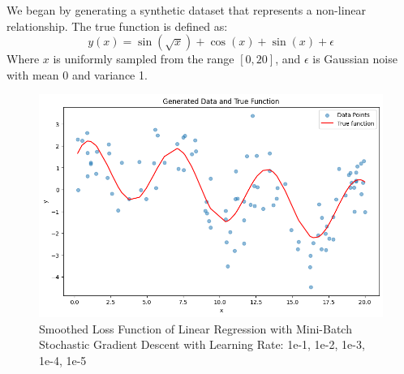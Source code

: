 \documentclass{article}
\begin{document}
We began by generating a synthetic dataset that represents a non-linear relationship. The true function is defined as:
\[
y(x) = \sin(\sqrt{x}) + \cos(x) + \sin(x) + \epsilon
\]
Where $x$ is uniformly sampled from the range $[0, 20]$, and $\epsilon$ is Gaussian noise with mean 0 and variance 1.
\begin{figure}[H]
    \centering
    \includegraphics[width=0.5\linewidth]{figures/data.png}
    \caption{Smoothed Loss Function of Linear Regression with Mini-Batch Stochastic Gradient Descent with Learning Rate: 1e-1, 1e-2, 1e-3, 1e-4, 1e-5}
    \label{learning rate}
\end{figure}
\end{document}
